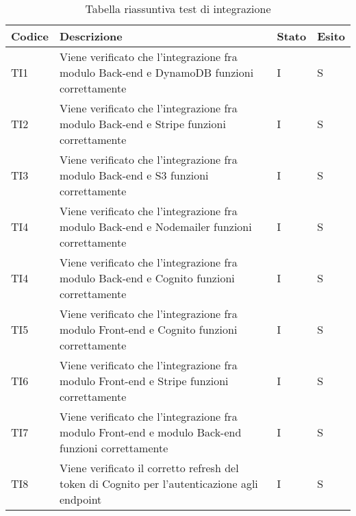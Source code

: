 {

\centering
\renewcommand{\arraystretch}{2}
\begin{longtable}{C{2cm} C{9.6cm} C{1.5cm} C{1cm}}
\caption{Tabella riassuntiva test di integrazione}\\
\textbf{Codice} &
\textbf{Descrizione}&
\textbf{Stato}&
\textbf{Esito}\\
\endhead


TI1 & Viene verificato che l'integrazione fra modulo Back-end e DynamoDB funzioni correttamente & I & S\\

TI2 & Viene verificato che l'integrazione fra modulo Back-end e Stripe funzioni correttamente & I & S\\

TI3 & Viene verificato che l'integrazione fra modulo Back-end e S3 funzioni correttamente & I & S\\

TI4 & Viene verificato che l'integrazione fra modulo Back-end e Nodemailer funzioni correttamente & I & S\\

TI4 & Viene verificato che l'integrazione fra modulo Back-end e Cognito funzioni correttamente & I & S\\

TI5 & Viene verificato che l'integrazione fra modulo Front-end e Cognito funzioni correttamente & I & S\\

TI6 & Viene verificato che l'integrazione fra modulo Front-end e Stripe funzioni correttamente & I & S\\

TI7 & Viene verificato che l'integrazione fra modulo Front-end e modulo Back-end funzioni correttamente & I & S\\

TI8 & Viene verificato il corretto refresh del token di Cognito per l'autenticazione agli endpoint & I & S\\



\end{longtable}

}

